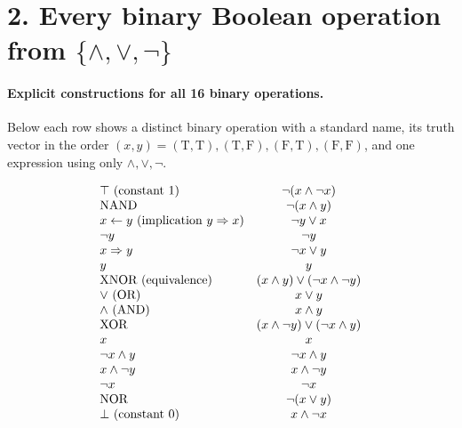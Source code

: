 \section*{2. Every binary Boolean operation from $\{\land,\lor,\lnot\}$}

\medskip

\paragraph{Explicit constructions for all 16 binary operations.}
Below each row shows a distinct binary operation with a standard name, its truth
vector in the order $(x,y)=(\mathrm{T},\mathrm{T}),(\mathrm{T},\mathrm{F}),(\mathrm{F},\mathrm{T}),(\mathrm{F},\mathrm{F})$,
and one expression using only $\land,\lor,\lnot$.

\[
\begin{array}{l c l}
\top \text{ (constant 1)} & \lnot(x\land \lnot x) \\
\text{NAND} & \lnot(x\land y) \\
x \leftarrow y \text{ (implication } y\Rightarrow x\text{)} & \lnot y \lor x \\
\lnot y & \lnot y \\
x \Rightarrow y & \lnot x \lor y \\
y & y \\
\text{XNOR (equivalence)} & (x\land y)\lor(\lnot x \land \lnot y) \\
\lor \text{ (OR)} & x\lor y \\
\land \text{ (AND)} & x\land y \\
\text{XOR} & (x\land \lnot y)\lor(\lnot x\land y) \\
x & x \\
\lnot x \land y & \lnot x \land y \\
x \land \lnot y & x \land \lnot y \\
\lnot x & \lnot x \\
\text{NOR} & \lnot(x\lor y) \\
\bot \text{ (constant 0)} & x\land \lnot x \\
\end{array}
\]
